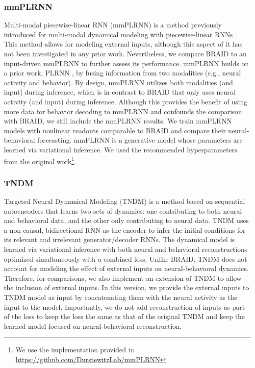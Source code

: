 \documentclass{article} %
\newcommand{\ourmethod}{BRAID}
\begin{document}
\subsubsection{mmPLRNN}
Multi-modal piecewise-linear RNN (mmPLRNN) is a method previously introduced for multi-modal dynamical modeling with piecewise-linear RNNs \citep{kramer2022}. This method allows for modeling external inputs, although this aspect of it has not been investigated in any prior work.  Nevertheless, we compare \ourmethod{} to an input-driven mmPLRNN to further assess its performance. mmPLRNN builds on a prior work, PLRNN \citep{durstewitz2017state}, by fusing information from two modalities (e.g., neural activity and behavior). By design, mmPLRNN utilizes both modalities (and input) during inference, which is in contrast to \ourmethod{} that only uses neural activity (and input) during inference. Although this provides the benefit of using more data for behavior decoding to mmPLRNN and confounds the comparison with \ourmethod{}, we still include the mmPLRNN results. We train mmPLRNN models with nonlinear readouts comparable to \ourmethod{} and compare their neural-behavioral forecasting. mmPLRNN is a generative model whose parameters are learned via variational inference. We used the recommended hyperparameters from the original work\footnote{We use the implementation provided in \url{https://github.com/DurstewitzLab/mmPLRNN}}.

\subsubsection{TNDM}\label{app:TNDM_method}
Targeted Neural Dynamical Modeling (TNDM) \citep{hurwitz2021targeted} is a method based on sequential autoencoders that learns two sets of dynamics: one contributing to both neural and behavioral data, and the other only contributing to neural data. TNDM uses a non-causal, bidirectional RNN as the encoder to infer the initial conditions for its relevant and irrelevant generator/decoder RNNs. The dynamical model is learned via variational inference with both neural and behavioral reconstructions optimized simultaneously with a combined loss. Unlike \ourmethod{}, TNDM does not account for modeling the effect of external inputs on neural-behavioral dynamics. Therefore, for comparisons, we also implement an extension of TNDM to allow the inclusion of external inputs. In this version, we provide the external inputs to TNDM model as input by concatenating them with the neural activity as the input to the model. Importantly, we do not add reconstruction of inputs as part of the loss to keep the loss the same as that of the original TNDM and keep the learned model focused on neural-behavioral reconstruction. 
\end{document}
